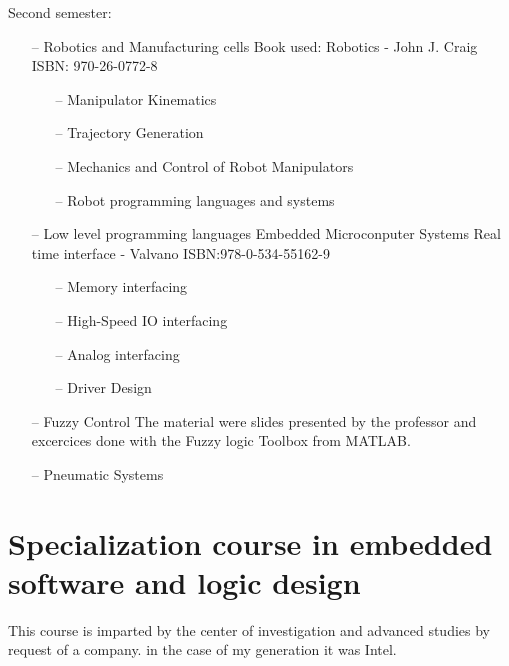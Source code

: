 \documentclass{article}
\begin{document}
Second semester:
    \begin{itemize}
     \setlength\itemsep{0pt}
        \item[--] Robotics and Manufacturing cells
            Book used: Robotics - John J. Craig  ISBN: 970-26-0772-8
            \begin{itemize}
     \setlength\itemsep{0pt}
                \item[--] Manipulator Kinematics
                \item[--] Trajectory Generation
                \item[--] Mechanics and Control of Robot Manipulators
                \item[--] Robot programming languages and systems
            \end{itemize}
        \item[--] Low level programming languages
            Embedded Microconputer Systems Real time interface - Valvano ISBN:978-0-534-55162-9
            \begin{itemize}
     \setlength\itemsep{0pt}
            \item[--] Memory interfacing
            \item[--] High-Speed IO interfacing
            \item[--] Analog interfacing
            \item[--] Driver Design
            \end{itemize}
        \item[--] Fuzzy Control
            The material were slides presented by the professor and excercices done with the
            Fuzzy logic Toolbox from MATLAB.
        \item[--] Pneumatic Systems
    \end{itemize}
                    



\section{Specialization course in embedded software and logic design}

This course is imparted by the center of investigation and advanced studies by request of
a company. in the case of my generation it was Intel.
\end{document}

